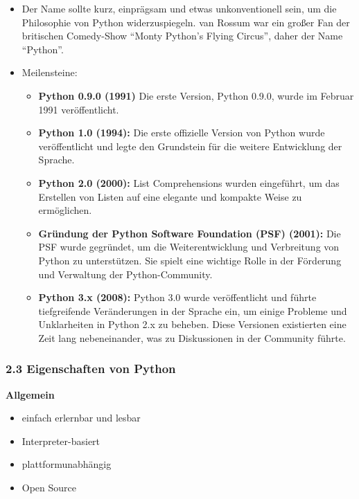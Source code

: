 \documentclass[
  11pt,
  a4paper,
  DIV=11,
  numbers=noendperiod]{scrartcl}
\providecommand{\tightlist}{%
  \setlength{\itemsep}{0pt}\setlength{\parskip}{0pt}}\usepackage{longtable,booktabs,array}
\begin{document}
\begin{itemize}
\item
  Der Name sollte kurz, einprägsam und etwas unkonventionell sein, um
  die Philosophie von Python widerzuspiegeln. van Rossum war ein großer
  Fan der britischen Comedy-Show ``Monty Python's Flying Circus'', daher
  der Name ``Python''.
\item
  Meilensteine:

  \begin{itemize}
  \tightlist
  \item
    \textbf{Python 0.9.0 (1991)} Die erste Version, Python 0.9.0, wurde
    im Februar 1991 veröffentlicht.
  \item
    \textbf{Python 1.0 (1994):} Die erste offizielle Version von Python
    wurde veröffentlicht und legte den Grundstein für die weitere
    Entwicklung der Sprache.
  \item
    \textbf{Python 2.0 (2000):} List Comprehensions wurden eingeführt,
    um das Erstellen von Listen auf eine elegante und kompakte Weise zu
    ermöglichen.
  \item
    \textbf{Gründung der Python Software Foundation (PSF) (2001):} Die
    PSF wurde gegründet, um die Weiterentwicklung und Verbreitung von
    Python zu unterstützen. Sie spielt eine wichtige Rolle in der
    Förderung und Verwaltung der Python-Community.
  \item
    \textbf{Python 3.x (2008):} Python 3.0 wurde veröffentlicht und
    führte tiefgreifende Veränderungen in der Sprache ein, um einige
    Probleme und Unklarheiten in Python 2.x zu beheben. Diese Versionen
    existierten eine Zeit lang nebeneinander, was zu Diskussionen in der
    Community führte.
  \end{itemize}
\end{itemize}

\subsubsection{2.3 Eigenschaften von
Python}\label{eigenschaften-von-python}

\textbf{Allgemein}

\begin{itemize}
\tightlist
\item
  einfach erlernbar und lesbar
\item
  Interpreter-basiert
\item
  plattformunabhängig
\item
  Open Source
\end{itemize}
\end{document}
